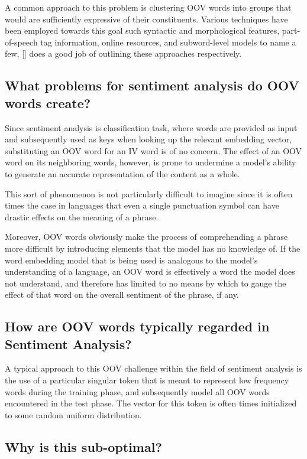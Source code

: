 \documentclass[12pt, a4paper]{report}
\theoremstyle{definition}
\theoremstyle{definition}%
\theoremstyle{definition}%
\theoremstyle{definition}%
\theoremstyle{definition}%
\theoremstyle{definition}%
\renewcommand{\cite}[1]{[\citealp{#1}]}
\begin{document}
A common approach to this problem is clustering OOV words into groups that would are sufficiently expressive of their constituents. Various techniques have been employed towards this goal such syntactic and morphological features, part-of-speech tag information, online resources, and subword-level models to name a few, \cite{naptali2012} does a good job of outlining these approaches respectively. 

\subsection{What problems for sentiment analysis do OOV words create?}

Since sentiment analysis is classification task, where words are provided as input and subsequently used as keys when looking up the relevant embedding vector, substituting an OOV word for an IV word is of no concern. The effect of an OOV word on its neighboring words, however, is prone to undermine a model's ability to generate an accurate representation of the content as a whole. 

This sort of phenomenon is not particularly difficult to imagine since it is often times the case in languages that even a single punctuation symbol can have drastic effects on the meaning of a phrase. 

Moreover, OOV words obviously make the process of comprehending a phrase more difficult by introducing elements that the model has no knowledge of. If the word embedding model that is being used is analogous to the model's understanding of a language, an OOV word is effectively a word the model does not understand, and therefore has limited to no means by which to gauge the effect of that word on the overall sentiment of the phrase, if any.

\subsection{How are OOV words typically regarded in Sentiment Analysis?}

A typical approach to this OOV challenge within the field of sentiment analysis is the use of a particular singular token that is meant to represent low frequency words during the training phase, and subsequently model all OOV words encountered in the test phase. The vector for this token is often times initialized to some random uniform distribution. 

\subsection{Why is this sub-optimal?}
\end{document}

